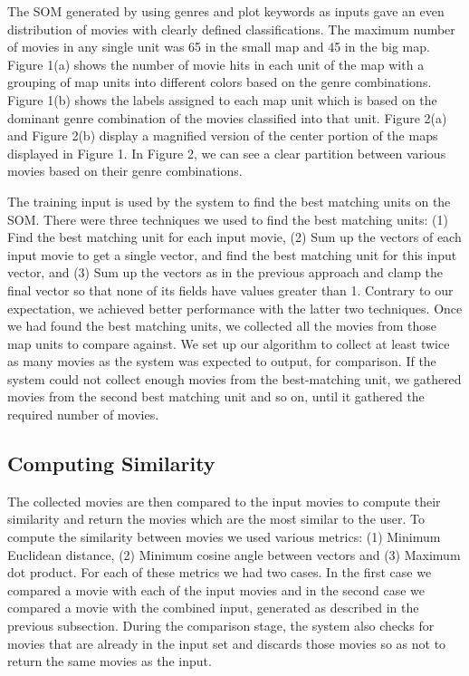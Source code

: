 \documentclass[conference]{IEEEtran}
\begin{document}
The SOM generated by using genres and plot keywords as inputs gave an even distribution of movies with clearly defined classifications. The maximum number of movies in any single unit was 65 in the small map and 45 in the big map. Figure 1(a) shows the number of movie hits in each unit of the map with a grouping of map units into different colors based on the genre combinations. Figure 1(b) shows the labels assigned to each map unit which is based on the dominant genre combination of the movies classified into that unit. Figure 2(a) and Figure 2(b) display a magnified version of the center portion of the maps displayed in Figure 1. In Figure 2, we can see a clear partition between various movies based on their genre combinations.

The training input is used by the system to find the best matching units on the SOM. There were three techniques we used to find the best matching units: (1) Find the best matching unit for each input movie, (2) Sum up the vectors of each input movie to get a single vector, and find the best matching unit for this input vector, and (3) Sum up the vectors as in the previous approach and clamp the final vector so that none of its fields have values greater than 1. Contrary to our expectation, we achieved better performance with the latter two techniques. Once we had found the best matching units, we collected all the movies from those map units to compare against. We set up our algorithm to collect at least twice as many movies as the system was expected to output, for comparison. If the system could not collect enough movies from the best-matching unit, we gathered movies from the second best matching unit and so on, until it gathered the required number of movies.

\subsection{Computing Similarity}

The collected movies are then compared to the input movies to compute their similarity and return the movies which are the most similar to the user. To compute the similarity between movies we used various metrics: (1) Minimum Euclidean distance, (2) Minimum cosine angle between vectors and (3) Maximum dot product. For each of these metrics we had two cases. In the first case we compared a movie with each of the input movies and in the second case we compared a movie with the combined input, generated as described in the previous subsection. During the comparison stage, the system also checks for movies that are already in the input set and discards those movies so as not to return the same movies as the input.
\end{document}
